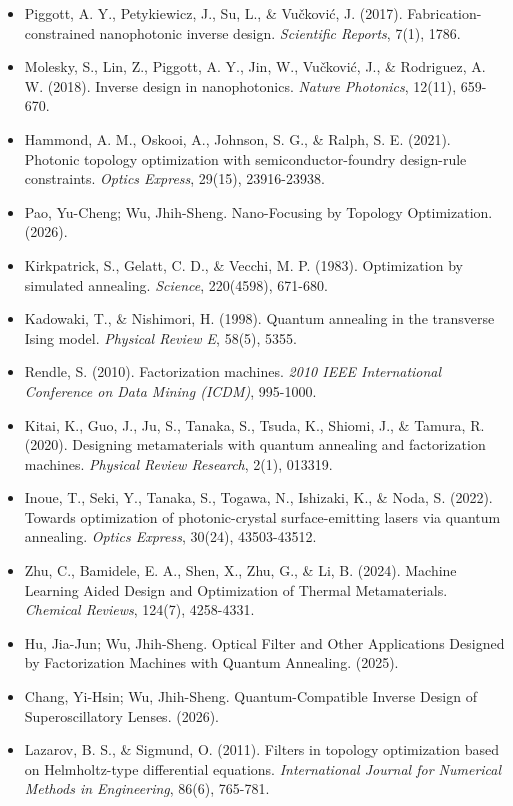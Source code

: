 \begin{itemize}
  \item[{[8]}] Piggott, A. Y., Petykiewicz, J., Su, L., \& Vu\v{c}kovi\'{c}, J. (2017). Fabrication-constrained nanophotonic inverse design. \textit{Scientific Reports}, 7(1), 1786.
  \item[{[9]}] Molesky, S., Lin, Z., Piggott, A. Y., Jin, W., Vu\v{c}kovi\'{c}, J., \& Rodriguez, A. W. (2018). Inverse design in nanophotonics. \textit{Nature Photonics}, 12(11), 659-670.
  \item[{[10]}] Hammond, A. M., Oskooi, A., Johnson, S. G., \& Ralph, S. E. (2021). Photonic topology optimization with semiconductor-foundry design-rule constraints. \textit{Optics Express}, 29(15), 23916-23938.
  \item[{[11]}] Pao, Yu-Cheng; Wu, Jhih-Sheng. Nano-Focusing by Topology Optimization. (2026).
  \item[{[12]}] Kirkpatrick, S., Gelatt, C. D., \& Vecchi, M. P. (1983). Optimization by simulated annealing. \textit{Science}, 220(4598), 671-680.
  \item[{[13]}] Kadowaki, T., \& Nishimori, H. (1998). Quantum annealing in the transverse Ising model. \textit{Physical Review E}, 58(5), 5355.
  \item[{[14]}] Rendle, S. (2010). Factorization machines. \textit{2010 IEEE International Conference on Data Mining (ICDM)}, 995-1000.
  \item[{[15]}] Kitai, K., Guo, J., Ju, S., Tanaka, S., Tsuda, K., Shiomi, J., \& Tamura, R. (2020). Designing metamaterials with quantum annealing and factorization machines. \textit{Physical Review Research}, 2(1), 013319.
  \item[{[16]}] Inoue, T., Seki, Y., Tanaka, S., Togawa, N., Ishizaki, K., \& Noda, S. (2022). Towards optimization of photonic-crystal surface-emitting lasers via quantum annealing. \textit{Optics Express}, 30(24), 43503-43512.
  \item[{[17]}] Zhu, C., Bamidele, E. A., Shen, X., Zhu, G., \& Li, B. (2024). Machine Learning Aided Design and Optimization of Thermal Metamaterials. \textit{Chemical Reviews}, 124(7), 4258-4331.
  \item[{[18]}] Hu, Jia-Jun; Wu, Jhih-Sheng. Optical Filter and Other Applications Designed by Factorization Machines with Quantum Annealing. (2025).
  \item[{[19]}] Chang, Yi-Hsin; Wu, Jhih-Sheng. Quantum-Compatible Inverse Design of Superoscillatory Lenses. (2026).
  \item[{[20]}] Lazarov, B. S., \& Sigmund, O. (2011). Filters in topology optimization based on Helmholtz-type differential equations. \textit{International Journal for Numerical Methods in Engineering}, 86(6), 765-781.

\end{itemize}
